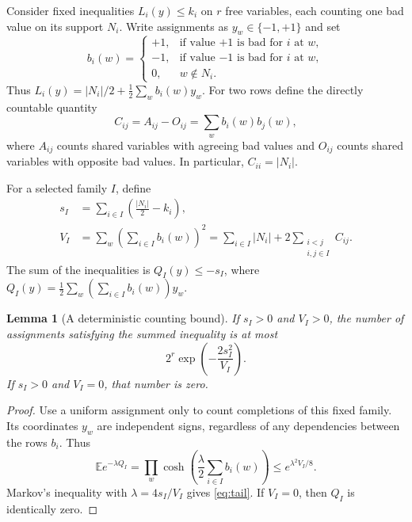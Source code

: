 \documentclass[11pt,a4paper]{article}
\newtheorem{lemma}[theorem]{Lemma}
\newcommand{\E}{\mathbb E}
\begin{document}
Consider fixed inequalities $L_i(y)\le k_i$ on $r$ free variables,
each counting one bad value on its support $N_i$. Write assignments as
$y_w\in\{-1,+1\}$ and set
\[
 b_i(w)=\begin{cases}
  +1,&\text{if value $+1$ is bad for $i$ at $w$},\\
  -1,&\text{if value $-1$ is bad for $i$ at $w$},\\
  0,&w\notin N_i.
 \end{cases}
\]
Thus $L_i(y)=|N_i|/2+\frac12\sum_w b_i(w)y_w$.
For two rows define the directly countable quantity
\begin{equation}
 C_{ij}=A_{ij}-O_{ij}=\sum_w b_i(w)b_j(w),             \label{eq:C}
\end{equation}
where $A_{ij}$ counts shared variables with agreeing bad values and
$O_{ij}$ counts shared variables with opposite bad values.
In particular, $C_{ii}=|N_i|$.

For a selected family $I$, define
\begin{align}
 s_I&=\sum_{i\in I}\left(\frac{|N_i|}{2}-k_i\right),\\
 V_I&=\sum_w\left(\sum_{i\in I}b_i(w)\right)^2
     =\sum_{i\in I}|N_i|+
                       2\sum_{\substack{i<j\\i,j\in I}}C_{ij}.
                                                        \label{eq:V}
\end{align}
The sum of the inequalities is
$Q_I(y)\le-s_I$, where
$Q_I(y)=\frac12\sum_w(\sum_{i\in I}b_i(w))y_w$.

\begin{lemma}[A deterministic counting bound]\label{lem:count}
If $s_I>0$ and $V_I>0$, the number of assignments satisfying the
summed inequality is at most
\begin{equation}
 2^r\exp\left(-\frac{2s_I^2}{V_I}\right).           \label{eq:tail}
\end{equation}
If $s_I>0$ and $V_I=0$, that number is zero.
\end{lemma}
\begin{proof}
Use a uniform assignment only to count completions of this fixed family.
Its coordinates $y_w$ are independent signs, regardless of any
dependencies between the rows $b_i$. Thus
\[
 \E e^{-\lambda Q_I}
 =\prod_w\cosh\left(\frac\lambda2\sum_{i\in I}b_i(w)\right)
 \le e^{\lambda^2V_I/8}.
\]
Markov's inequality with $\lambda=4s_I/V_I$ gives
\eqref{eq:tail}. If $V_I=0$, then $Q_I$ is identically zero.
\end{proof}
\end{document}
